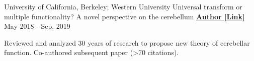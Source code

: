 \begin{cventries}
  \cventry
    {University of California, Berkeley; Western University} %
    {Universal transform or multiple functionality? A novel perspective on the cerebellum} %
    {\href{https://www.sciencedirect.com/science/article/pii/S0896627319303782}{\textbf{Author [Link]}}}
    {May 2018 - Sep. 2019}
    {
      \begin{cvitems} %
      	\item {Reviewed and analyzed 30 years of research to propose new theory of cerebellar function. Co-authored subsequent paper (>70 citations).}
      \end{cvitems}
    }
 
\end{cventries}